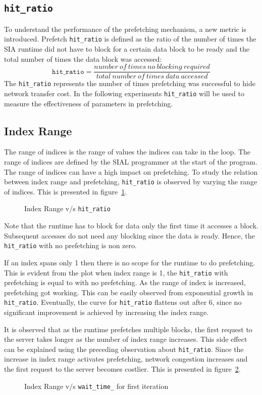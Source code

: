 \subsection{\texttt{hit\_ratio}}\label{sec:hit_ratio}
To understand the performance of the prefetching mechanism, a new metric is introduced.
Prefetch \texttt{hit\_ratio} is defined as the ratio of the number of times the
SIA runtime did not have to block for a certain data block to be ready and the total
number of times the data block was accessed:
\[
  \texttt{hit\_ratio} = \frac{number~of~times~no~blocking~required}{total~number~of~times~data~accessed}
\]
The \texttt{hit\_ratio} represents the number of times prefetching was successful
to hide network transfer cost. In the following experiments \texttt{hit\_ratio}
will be used to measure the effectiveness of parameters in prefetching.

\subsection{Index Range}
The range of indices is the range of values the indices can take in the loop.
The range of indices are defined by the SIAL programmer at the start of the program.
The range of indices can have a high impact on prefetching. To study the relation
between index range and prefetching, \texttt{hit\_ratio} is observed by varying
the range of indices. This is presented in figure~\ref{fig:hitratio}.
\begin{figure}[h]
  
  \caption{Index Range v/s \texttt{hit\_ratio}}
  \label{fig:hitratio}
\end{figure}

Note that the runtime has to block for data only the first time it accesses a block.
Subsequent accesses do not need any blocking since the data is ready. Hence, the
\texttt{hit\_ratio} with no prefetching is non zero.

If an index spans only 1 then there is no scope for the runtime to do prefetching.
This is evident from the plot when index range is 1, the \texttt{hit\_ratio} with
prefetching is equal to with no prefetching. As the range of index is increased,
prefetching got working. This can be easily observed from exponential growth in
\texttt{hit\_ratio}. Eventually, the curve for \texttt{hit\_ratio} flattens out
after 6, since no significant improvement is achieved by increasing the index range.

It is observed that as the runtime prefetches multiple blocks,
the first request to the server takes longer as the number of index range increases. This
side effect can be explained using the preceding observation about \texttt{hit\_ratio}.
Since the increase in index range activates prefetching, network congestion
increases and the first request
to the server becomes costlier. This is presented in figure~\ref{fig:p_first_mean}.
\begin{figure}[h]
  
  \caption{Index Range v/s \texttt{wait\_time\_} for first iteration}
  \label{fig:p_first_mean}
\end{figure}

